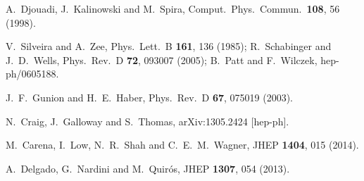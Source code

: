   A.~Djouadi, J.~Kalinowski and M.~Spira,
  Comput.\ Phys.\ Commun.\  {\bf 108}, 56 (1998).
  
  V.~Silveira and A.~Zee,
  Phys.\ Lett.\ B {\bf 161}, 136 (1985); 
  R.~Schabinger and J.~D.~Wells,
  Phys.\ Rev.\ D {\bf 72}, 093007 (2005);
  B.~Patt and F.~Wilczek,
  hep-ph/0605188.

  J.~F.~Gunion and H.~E.~Haber,
  Phys.\ Rev.\ D {\bf 67}, 075019 (2003).

  N.~Craig, J.~Galloway and S.~Thomas,
  arXiv:1305.2424 [hep-ph].
  
  M.~Carena, I.~Low, N.~R.~Shah and C.~E.~M.~Wagner,
  JHEP {\bf 1404}, 015 (2014).

  A.~Delgado, G.~Nardini and M.~Quir\'os,
  JHEP {\bf 1307}, 054 (2013).
  
